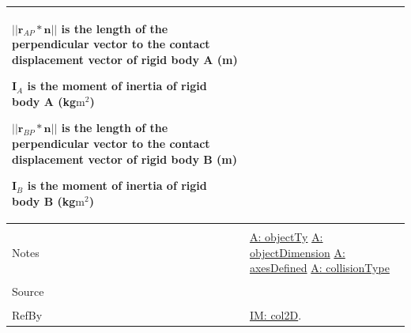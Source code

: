 \documentclass[12pt]{article}
\begin{document}
\begin{minipage}{\textwidth}
\begin{tabular}{p{} p{}}
\begin{symbDescription}
                                                  \item{$||{\mathbf{r}_{AP}}*\mathbf{n}||$ is the length of the perpendicular vector to the contact displacement vector of rigid body A (m)}
                                                  \item{${\mathbf{I}_{A}}$ is the moment of inertia of rigid body A (kg$\text{m}^{2}$)}
                                                  \item{$||{\mathbf{r}_{BP}}*\mathbf{n}||$ is the length of the perpendicular vector to the contact displacement vector of rigid body B (m)}
                                                  \item{${\mathbf{I}_{B}}$ is the moment of inertia of rigid body B (kg$\text{m}^{2}$)}
                                                  \end{symbDescription}
                                                  \\ \midrule \\
                                                  Notes & \hyperref[A:objectTy]{A: objectTy}
                                                          \hyperref[A:objectDimension]{A: objectDimension}
                                                          \hyperref[A:axesDefined]{A: axesDefined}
                                                          \hyperref[A:collisionType]{A: collisionType}
                                                          \\ \midrule \\
                                                          Source & \\ \midrule \\
                                                                   RefBy & \hyperref[IM:col2D]{IM: col2D}.
\\ \bottomrule \end{tabular}
\end{minipage}\\
~\newline
\end{document}
